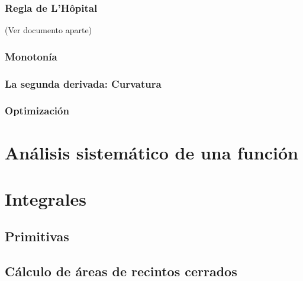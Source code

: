 \subsubsection{Regla de L'Hôpital}
(Ver documento aparte)
\subsubsection{Monotonía}
\subsubsection{La segunda derivada: Curvatura}
\subsubsection{Optimización}
\section{Análisis sistemático de una función}
\section{Integrales}
\subsection{Primitivas}
\subsection{Cálculo de áreas de recintos cerrados}